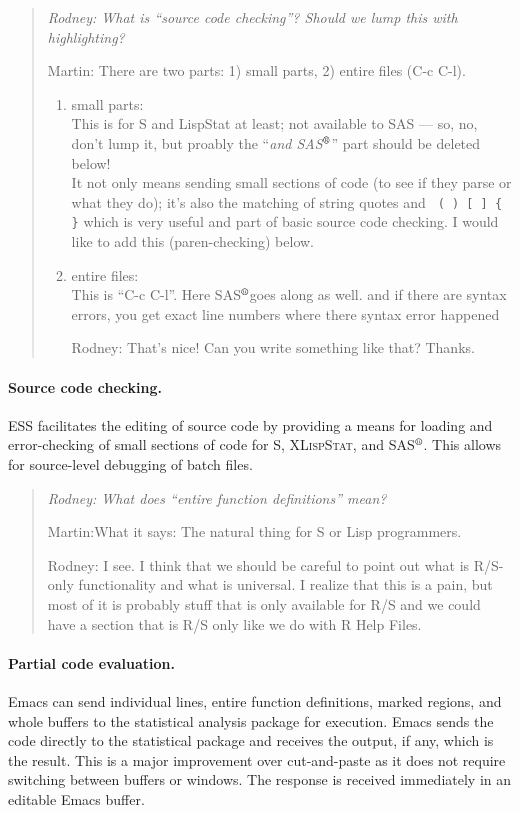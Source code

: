 \documentclass{article}
\newcommand*{\SAS}{\textsc{SAS}$^{\mbox{\scriptsize\textregistered}}$}
\newcommand*{\XLispStat}{\textsc{XLispStat}}
\newenvironment{Comment}{\begin{quote}\small\itshape }{\end{quote}}
\begin{document}
\begin{Comment}
 Rodney:  What is ``source code checking''?
          Should we lump this with highlighting?

 Martin: There are two parts:  1) small parts, 2) entire files (C-c C-l).
 \begin{enumerate}
 \item small parts:\\
   This is for S and LispStat at least; not available to SAS
   --- so, no, don't lump it, but proably the ``\emph{and \SAS}'' part
   should be deleted below! \\
   It not only means sending small sections of code (to see if they parse or
   what they do); it's also the matching of string quotes and
   \verb| ( ) [ ] { }|
   which is very useful and part of basic source code checking.
   I would like to add this (paren-checking) below.
 \item entire files:\\
   This is ``C-c C-l''.
   Here \SAS goes along as well.
   and if there are syntax errors, you get exact line numbers where there
   syntax error happened

 Rodney:  That's nice!  Can you write something like that?  Thanks.
 \end{enumerate}
\end{Comment}

\paragraph{Source code checking.}
ESS facilitates the editing of source code by providing a means for
loading and error-checking of small sections of code for S,
\XLispStat, and \SAS.  This allows for source-level debugging of batch
files.

\begin{Comment}
 Rodney:  What does ``entire function definitions'' mean?

 Martin:What it says: The natural thing for S or Lisp programmers.

 Rodney:  I see.  I think that we should be careful to point out what is
 R/S-only functionality and what is universal.  I realize that this is a
 pain, but most of it is probably stuff that is only available for R/S
 and we could have a section that is R/S only like we do with R Help Files. 
\end{Comment}

\paragraph{Partial code evaluation.}
Emacs can send individual lines, entire function definitions, marked
regions, and whole buffers to the statistical analysis package for
execution.  Emacs sends the code directly to
the statistical package and receives the output, if any, which is
the result.  This is a major improvement over cut-and-paste as it does
not require switching between buffers or windows.  The response is received
immediately in an editable Emacs buffer.
\end{document}
